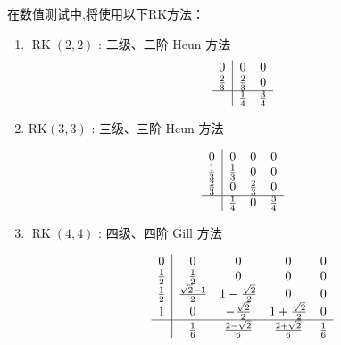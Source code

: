 在数值测试中,将使用以下RK方法：
\begin{enumerate}
	\item $\operatorname{RK}(2,2)$ : 二级、二阶 Heun 方法 %
\begin{equation}
	\begin{array}{c|cc}
	0 & 0 & 0 \\
	\frac{2}{3} & \frac{2}{3} & 0 \\
	\hline & \frac{1}{4} & \frac{3}{4}
	\end{array}
	\end{equation}

	\item $\mathrm{RK}(3,3)$ : 三级、三阶 Heun 方法 %

	\begin{equation}
		\begin{array}{c|ccc}
		0 & 0 & 0 & 0 \\
		\frac{1}{3} & \frac{1}{3} & 0 & 0 \\
		\frac{2}{3} & 0 & \frac{2}{3} & 0 \\
		\hline & \frac{1}{4} & 0 & \frac{3}{4}
		\end{array}
		\end{equation}
	
    \item $\operatorname{RK}(4,4)$ : 四级、四阶 Gill 方法 %
	
	\begin{equation}
		\begin{array}{c|cccc}
		0 & 0 & 0 & 0 & 0 \\
		\frac{1}{2} & \frac{1}{2} & 0 & 0 & 0 \\
		\frac{1}{2} & \frac{\sqrt{2}-1}{2} & 1-\frac{\sqrt{2}}{2} & 0 & 0 \\
		1 & 0 & -\frac{\sqrt{2}}{2} & 1+\frac{\sqrt{2}}{2} & 0 \\
		\hline & \frac{1}{6} & \frac{2-\sqrt{2}}{6} & \frac{2+\sqrt{2}}{6} & \frac{1}{6}
		\end{array}
		\end{equation}
	
\end{enumerate}

